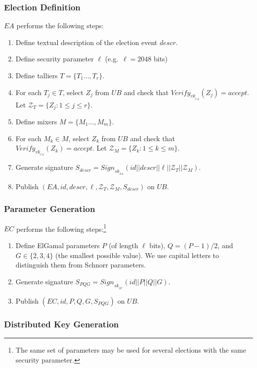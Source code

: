 \documentclass[bibtotoc,halfparskip,oneside]{scrreprt}
\newcommand{\eid}{\mathit{id}\xspace}
\newcommand{\descr}{\mathit{descr}\xspace}
\newcommand{\sk}[1]{\mathit{sk}_{#1}\xspace}
\newcommand{\vk}[1]{\mathit{vk}_{#1}\xspace}
\newcommand{\SK}[1]{\sk{_#1}\xspace}
\newcommand{\VK}[1]{\vk{_#1}\xspace}
\newcommand{\CA}{\ensuremath{\mathit{CA}}\xspace}
\newcommand{\EA}{\ensuremath{\mathit{EA}}\xspace}
\newcommand{\EC}{\ensuremath{\mathit{EC}}\xspace}
\newcommand{\UB}{\ensuremath{\mathit{UB}}\xspace}
\newcommand{\Tallier}[1]{\ensuremath{\mathit{T}_{#1}}\xspace}
\newcommand{\Mixer}[1]{\ensuremath{\mathit{M}_{#1}}\xspace}
\begin{document}
\subsubsection{Election Definition}

\EA performs the following steps: 
\begin{enumerate}
	\item Define textual description of the election event $\descr$.
	\item Define security parameter $\ell$ (e.g.\ $\ell=2048$ bits)
	\item Define talliers $T=\{\Tallier{1}\ldots,\Tallier{r}\}$.
	\item For each $\Tallier{j}\in T$, select $Z_{j}$ from \UB and check that $\mathit{Verify}_{\VK{\CA}}(Z_{j})=\mathit{accept}$. Let $\mathcal{Z}_{T}=\{Z_j:1\leq j\leq r\}$.
	\item Define mixers $M=\{\Mixer{1}\ldots,\Mixer{m}\}$.
	\item For each $\Mixer{k}\in M$, select $Z_{k}$ from \UB and check that $\mathit{Verify}_{\VK{\CA}}(Z_{k})=\mathit{accept}$. Let $\mathcal{Z}_{M}=\{Z_k:1\leq k\leq m\}$.
	\item Generate signature $S_{\descr}=\mathit{Sign}_{\SK{\EA}}(\eid||\descr||\ell||\mathcal{Z}_{T}||\mathcal{Z}_{M})$.
	\item Publish $(\EA,\eid,\descr,\ell,\mathcal{Z}_{T},\mathcal{Z}_{M},S_{\descr})$ on \UB.
\end{enumerate}

\subsubsection{Parameter Generation}

\EC performs the following steps:\footnote{The same set of parameters may be used for several elections with the same security parameter.}
\begin{enumerate}
	\item Define ElGamal parameters $P$ (of length $\ell$ bits), $Q = (P-1)/2$, and $G \in\{2,3,4\}$ (the smallest possible value). We use capital letters to distinguish them from Schnorr parameters.
	\item Generate signature $S_{\mathit{PQG}}=\mathit{Sign}_{\SK{\EC}}(\eid||P||Q||G)$.
	\item Publish $(\EC,\eid,P,Q,G,S_{\mathit{PQG}})$ on \UB.
\end{enumerate}

\subsubsection{Distributed Key Generation}
\end{document}
